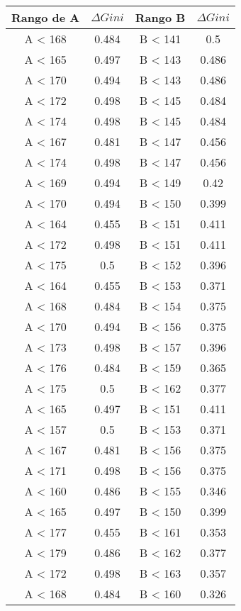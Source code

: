 \documentclass[
10pt, %
a4paper, %
]{article}
\begin{document}
\begin{table}[H]
	\centering
	\begin{tabular}{c|c|c|c}
		\toprule
		Rango de A & $\Delta Gini$ & Rango B & $\Delta Gini$\\\midrule
		A < 168 & 0.484 & B < 141 & 0.5\\\midrule
		A < 165 & 0.497 & B < 143 & 0.486\\\midrule	
		A < 170 & 0.494	& B < 143 & 0.486\\\midrule
		A < 172 & 0.498 & B < 145 & 0.484\\\midrule
		A < 174 & 0.498 & B < 145 & 0.484\\\midrule
		A < 167 & 0.481 & B < 147 &	0.456\\\midrule
		A < 174 & 0.498 & B < 147 &	0.456\\\midrule
		A < 169 & 0.494 & B < 149 & 0.42\\\midrule
		A < 170 & 0.494 & B < 150 & 0.399\\\midrule
		A < 164 & 0.455 & B < 151 & 0.411\\\midrule
		A < 172 & 0.498 & B < 151 & 0.411\\\midrule
		A < 175 & 0.5   & B < 152 & 0.396\\\midrule
		A < 164 & 0.455	& B < 153 &	0.371\\\midrule
		A < 168 & 0.484 & B < 154 &	0.375\\\midrule
		A < 170 & 0.494 & B < 156 &	0.375\\\midrule
		A < 173 & 0.498	& B < 157 &	0.396\\\midrule
		A < 176 & 0.484 & B < 159 &	0.365\\\midrule
		A < 175 & 0.5   & B < 162 &	0.377\\\midrule
		A < 165 & 0.497 & B < 151 &	0.411\\\midrule
		A < 157 & 0.5   & B < 153 &	0.371\\\midrule
		A < 167 & 0.481 & B < 156 &	0.375\\\midrule
		A < 171 & 0.498	& B < 156 &	0.375\\\midrule
		A < 160 & 0.486	& B < 155 &	0.346\\\midrule
		A < 165 & 0.497	& B < 150 &	0.399\\\midrule
		A < 177 & 0.455	& B < 161 &	0.353\\\midrule
		A < 179 & 0.486	& B < 162 &	0.377\\\midrule
		A < 172 & 0.498	& B < 163 &	0.357\\\midrule
		A < 168 & 0.484	& B < 160 &	0.326\\\midrule

\end{tabular}
\end{table}
\end{document}
